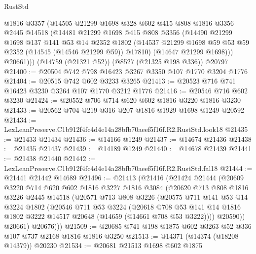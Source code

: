 \begin{lexlean}{RustStd}
\begin{coremodule}
        @1816
        @3357
        (@14505
          @21299
          @1698
          @328
          @602
          @415
          @808
          @1816
          @3356
          @2445
          @14518
          (@14481
            @21299
            @1698
            @415
            @808
            @3356
            (@14490
              @21299
              @1698
              @137
              @141
              @53
              @14
              @2352
              @1802
              (@14537 @21299 @1698 @59 @53 @59 @2352 (@14545 (@14546 @21299 @59)) @17810)
              (@14647 @21299 @1698)))
          @20661)))
    (@14759 (@21321 @52))
    (@8527 (@21325 @198 @336))
    @20797
@21400 := @20504 @742 @798 @16423 @3267 @3350 @107 @1770 @3204 @1776
@21404 := @20515 @742 @602 @3233 @3265
@21413 := @20523 @716 @741 @16423 @3230 @3264 @107 @1770 @3212 @1776
@21416 := @20546 @716 @602 @3230
@21424 := @20552 @706 @714 @620 @602 @1816 @3220 @1816 @3230
@21433 := @20562 @704 @219 @316 @207 @1816 @1929 @1698 @1249 @20592
@21434 := LexLeanPreserve.C1b912f4fc4d4e14a28bfb70aeef5f16f.R2.RustStd.look18
@21435 := @21433 @21434
@21436 := @14166 @1249
@21437 := @14674 @21436
@21438 := @21435 @21437
@21439 := @14189 @1249
@21440 := @14678 @21439
@21441 := @21438 @21440
@21442 := LexLeanPreserve.C1b912f4fc4d4e14a28bfb70aeef5f16f.R2.RustStd.fal18
@21444 := @21441 @21442 @14689
@21496 := @21413
    (@21416
      (@21424
        @21444
        (@20609
          @3220
          @714
          @620
          @602
          @1816
          @3227
          @1816
          @3084
          (@20620
            @713
            @808
            @1816
            @3226
            @2445
            @14518
            (@20571
              @713
              @808
              @3226
              (@20575
                @711
                @141
                @53
                @14
                @3224
                @1802
                (@20546
                  @711
                  @53
                  @3224
                  (@20618
                    @708
                    @53
                    @141
                    @14
                    @1816
                    @1802
                    @3222
                    @14517
                    @20648
                    (@14659 (@14661 @708 @53 @3222))))
                @20590))
            @20661)
          @20676)))
@21509 := @20685 @741 @198 @1875 @602 @3263 @52 @336 @107 @737 @2168 @1816 @1816 @3250
@21513 := @14371 (@14374 (@18208 @14379)) @20230
@21534 := @20681
    @21513
    @1698
    @602
    @1875

\end{coremodule}
\end{lexlean}
